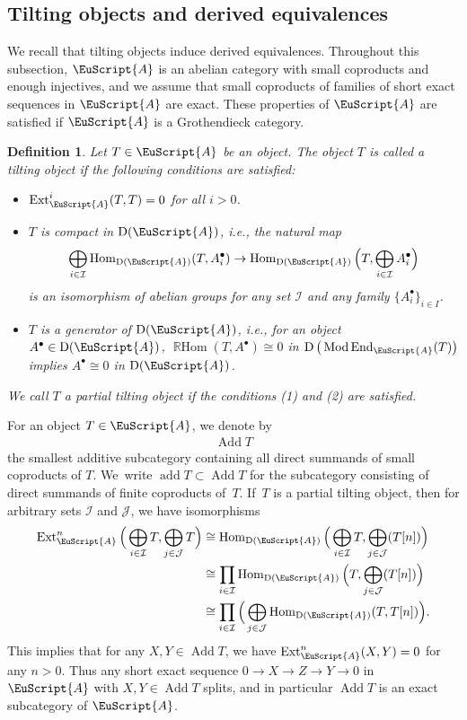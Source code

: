 \documentclass[10pt,a4paper]{amsart}
\newtheorem{dfn}{Definition}[section]
\numberwithin{equation}{section}
\newcommand{\Hom}{\operatorname{Hom}}
\newcommand{\Ext}{\operatorname{Ext}}
\newcommand{\RHom}{\operatorname{{\mathbb R}Hom}}
\newcommand{\End}{\operatorname{End}}
\newcommand{\Mod}{\operatorname{Mod}}
\newcommand{\add}{\operatorname{add}}
\newcommand{\Add}{\operatorname{Add}}
\newcommand{\D}{\operatorname{D}}
\newcommand{\cI}{\mathcal{I}}
\newcommand{\cJ}{\mathcal{J}}
\newcommand{\scrA}{\EuScript{A}}
\begin{document}
\subsection{Tilting objects and derived equivalences}

We recall that tilting objects induce derived equivalences.
Throughout this subsection, $\scrA$ is an abelian category with small coproducts and enough injectives, and we assume that small coproducts of families of short exact sequences in $\scrA$ are exact. These properties of $\scrA$ are satisfied if $\scrA$ is a Grothendieck category.

\begin{dfn} Let $T\in \scrA$ be an object. The object $T$ is called a {\it tilting object} if the following conditions are satisfied:
\begin{itemize}\itemsep=0pt
\item[$1.$] $\Ext_{\scrA}^i(T,T)=0$ for all $i>0$.

\item[$2.$] $T$ is {\it compact} in $\D(\scrA)$, i.e., the natural map
\begin{gather*}
\bigoplus_{i\in \cI}\Hom_{\D(\scrA)}(T,A_i^{\bullet})\to\Hom_{\D(\scrA)}\Big(T,\bigoplus_{i\in\cI}A_i^{\bullet}\Big)
\end{gather*}
is an isomorphism of abelian groups for any set $\cI$ and any family $\{A_i^{\bullet}\}_{i\in I}$.

\item[$3.$] $T$ is a {\it generator} of $\D(\scrA)$, i.e., for an object $A^{\bullet}\in \D(\scrA)$, $\RHom(T,A^{\bullet})\cong0$ in $\D\big(\Mod\End_{\scrA}(T)\big)$ implies $A^{\bullet}\cong0$ in $\D(\scrA)$.
\end{itemize}
We call $T$ a {\it partial tilting object} if the conditions (1) and (2) are satisfied.
\end{dfn}

For an object $T\in \scrA$, we denote by
\begin{gather*}
\Add T
\end{gather*}
the smallest additive subcategory containing all direct summands of small coproducts of $T$. We~write $\add T\subset \Add T$ for the subcategory consisting of direct summands of finite coproducts of~$T$. If~$T$ is a partial tilting object, then for arbitrary sets $\cI$ and $\cJ$, we have isomorphisms
\begin{align*}
\Ext^n_{\scrA}\Big(\bigoplus_{i\in \cI}T,\bigoplus_{j\in \cJ}T\Big) &\cong\Hom_{\D(\scrA)}\Big(\bigoplus_{i\in \cI}T,\bigoplus_{j\in \cJ}(T[n])\Big)
\\
&\cong \prod_{i\in \cI}\Hom_{\D(\scrA)}\Big(T,\bigoplus_{j\in \cJ}(T[n])\Big)
\\
&\cong \prod_{i\in\cI}\Big(\bigoplus_{j\in\cJ}\Hom_{\D(\scrA)}(T,T[n])\Big).
\end{align*}
This implies that for any $X,Y\in \Add T$, we have $\Ext_{\scrA}^n(X,Y)=0$ for any $n>0$. Thus any short exact sequence $0\to X\to Z\to Y\to0$ in $\scrA$ with $X,Y\in \Add T$ splits, and in particular $\Add T$ is an exact subcategory of $\scrA$.
\end{document}
